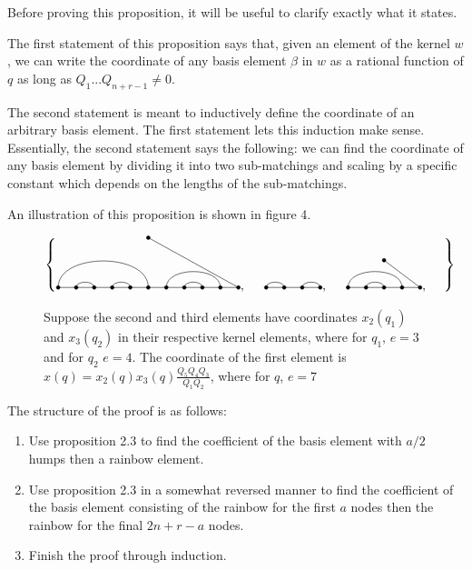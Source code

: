 \documentclass{amsart}
\begin{document}
\vspace{5mm}
Before proving this proposition, it will be useful to clarify exactly what it states.

\vspace{5mm}
The first statement of this proposition says that, given an element of the kernel $w$, we can write the coordinate of any basis element $\beta$ in $w$ as a rational function of $q$ as long as $Q_1...Q_{n+r-1}\not=0$.

\vspace{5mm}
The second statement is meant to inductively define the coordinate of an arbitrary basis element. The first statement lets this induction make sense. Essentially, the second statement says the following: we can find the coordinate of any basis element by dividing it into two sub-matchings and scaling by a specific constant which depends on the lengths of the sub-matchings.

\vspace{5mm}
An illustration of this proposition is shown in figure 4.

	
	\begin{figure}
		\def\cbasisspacing{5mm}
		
		$\cbr{
			\begin{gathered}
			\GeneralizedMatching{11}{1/6, 2/3,4/5,7/10,8/9}{1}{11/1}{11/8}, \hspace{\cbasisspacing}
			\Matching{4}{1/2, 3/4}, 
			\hspace{\cbasisspacing}
			\GeneralizedMatching{5}{1/4, 2/3}{1}{5/1}{3/4}, \hspace{\cbasisspacing}
			\end{gathered}}$ 
		\caption{Suppose the second and third elements have coordinates $x_2(q_1)$ and $x_3(q_2)$ in their respective kernel elements, where for $q_1$, $e=3$ and for $q_2$ $e=4$. The coordinate of the first element is $x(q)=x_2(q)x_3(q)\frac{Q_5Q_4Q_3}{Q_1Q_2}$, where for $q$, $e=7$}
	\end{figure}

\vspace{5mm}
The structure of the proof is as follows: 

\begin{enumerate}
	\item Use proposition 2.3 to find the coefficient of the basis element with $a/2$ humps then a rainbow element.
	
	\item Use proposition 2.3 in a somewhat reversed manner to find the coefficient of the basis element consisting of the rainbow for the first $a$ nodes then the rainbow for the final $2n+r-a$ nodes.
	
	\item Finish the proof through induction.
\end{enumerate}
\end{document}
